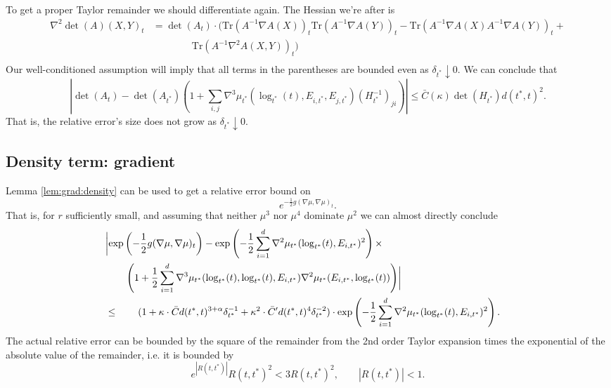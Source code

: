 \documentclass{article}
\begin{document}
 To get a proper Taylor remainder we should differentiate again.
 The Hessian we're after is
 $$
\begin{aligned}
  \nabla^2 \det (A)(X, Y)_t &= \det(A_t) \cdot \biggl(\text{Tr}(A^{-1}\nabla A(X))_t \text{Tr}(A^{-1}\nabla A(Y))_t - \text{Tr}(A^{-1}\nabla A(X)A^{-1}\nabla A(Y))_t + \\
  & \qquad \qquad \text{Tr}(A^{-1}\nabla^2 A(X, Y))_t \biggr) \\
\end{aligned}
 $$
Our well-conditioned assumption will imply that all terms in the parentheses are bounded even as $\delta_{t^*} \downarrow 0$.
We can conclude that
$$
\left|\det( A_t) - \det (A_{t^*}) \left(1 + \sum_{i,j} \nabla^3 \mu_{t^*}(\log_{t^*}(t), E_{i,t^*}, E_{j,t^*}) (H_{t^*}^{-1})_{ji}\right) \right| \leq \bar{C}(\kappa) \det(H_{t^*}) d(t^*,t)^2.
$$
That is, the relative error's size does not grow as $\delta_{t^*} \downarrow 0$.

\subsection{Density term: gradient}

Lemma \ref{lem:grad:density} can be used to get a relative error bound on
$$
e^{-\frac{1}{2}g(\nabla \mu, \nabla \mu)_t}.
$$
That is, for $r$ sufficiently small, and assuming that neither $\mu^3$ nor $\mu^4$ dominate $\mu^2$ we can almost directly conclude 
\begin{equation}
\begin{aligned}
\lefteqn{  \biggl|\exp\left(-\frac{1}{2}g(\nabla \mu, \nabla \mu)_t\right) - \exp\left(-\frac{1}{2} \sum_{i=1}^d \nabla^2 \mu_{t^*}(\log_{t^*}(t), E_{i,t^*})^2\right) \times} \\
& \qquad   \left(1 + \frac{1}{2} \sum_{i=1}^d \nabla^3 \mu_{t^*}(\log_{t^*}(t), \log_{t^*}(t), E_{i,t^*}) \nabla^2 \mu_{t^*}(E_{i,t^*}, \log_{t^*}(t)) \right) \biggr|  \\
&  \leq \qquad (1 + \kappa \cdot \bar{C} d(t^*,t)^{3+\alpha} \delta_{t^*}^{-1} + \kappa^2 \cdot \bar{C}' d(t^*,t)^4 \delta_{t^*}^{-2}) \cdot \exp\left(-\frac{1}{2} \sum_{i=1}^d \nabla^2 \mu_{t^*}(\log_{t^*}(t), E_{i,t^*})^2\right) .
\end{aligned}
\end{equation}
The actual relative error can be bounded by the square of the  remainder from the 2nd order Taylor expansion
times the exponential of the absolute value of the remainder, i.e. it is bounded by
$$
e^{|R(t,t^*)|} R(t,t^*)^2 < 3 R(t,t^*)^2, \qquad |R(t,t^*)|<1.
$$
\end{document}
